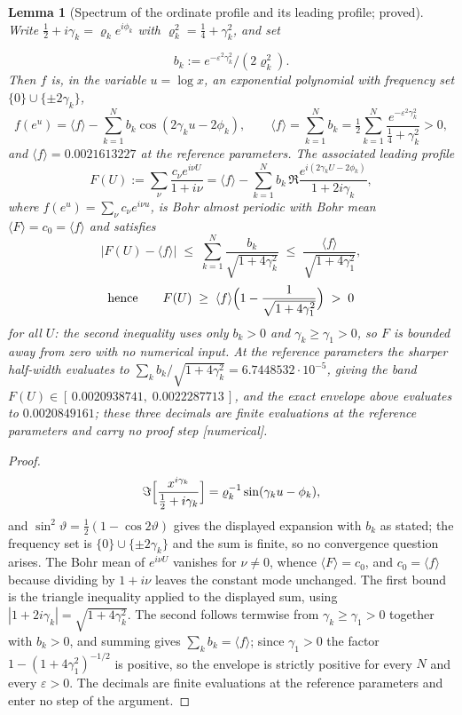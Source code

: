 \documentclass[11pt]{article}
\newtheorem{lemma}[theorem]{Lemma}
\begin{document}
\begin{lemma}[Spectrum of the ordinate profile and its leading profile;
proved]
\label{lem:fmean}
Write $\tfrac12+i\gamma_k=\varrho_ke^{i\phi_k}$ with
$\varrho_k^2=\tfrac14+\gamma_k^2$, and set

\[
b_k:=e^{-\varepsilon^2\gamma_k^2}/(2\varrho_k^2).
\]
 Then $f$ is, in the
variable $u=\log x$, an exponential polynomial with frequency set
$\{0\}\cup\{\pm2\gamma_k\}$,
\[
f(e^u)=\langle f\rangle-\sum_{k=1}^{N}b_k\cos(2\gamma_ku-2\phi_k),
\qquad
\langle f\rangle=\sum_{k=1}^{N}b_k
=\tfrac12\sum_{k=1}^{N}\frac{e^{-\varepsilon^2\gamma_k^2}}
{\tfrac14+\gamma_k^2}>0 ,
\]
and $\langle f\rangle=0.0021613227$ at the reference parameters. The
associated \emph{leading profile}
\[
F(U):=\sum_{\nu}\frac{c_\nu e^{i\nu U}}{1+i\nu}
=\langle f\rangle-\sum_{k=1}^{N}b_k\,
\Re\frac{e^{i(2\gamma_kU-2\phi_k)}}{1+2i\gamma_k},
\]
where $f(e^u)=\sum_\nu c_\nu e^{i\nu u}$, is Bohr almost periodic with Bohr
mean $\langle F\rangle=c_0=\langle f\rangle$ and satisfies
\[
|F(U)-\langle f\rangle|\;\le\;
\sum_{k=1}^{N}\frac{b_k}{\sqrt{1+4\gamma_k^2}}
\;\le\;\frac{\langle f\rangle}{\sqrt{1+4\gamma_1^2}},
\]
\[
\text{hence}\qquad
F(U)\;\ge\;\langle f\rangle
\Bigl(1-\frac{1}{\sqrt{1+4\gamma_1^2}}\Bigr)\;>\;0
\]
for all $U$: the second inequality uses only $b_k>0$ and
$\gamma_k\ge\gamma_1>0$, so $F$ is bounded away from zero with no numerical
input. At the reference parameters the sharper half-width evaluates to
$\sum_{k}b_k/\sqrt{1+4\gamma_k^2}=6.7448532\cdot10^{-5}$, giving the
band $F(U)\in[\,0.0020938741,\;0.0022287713\,]$, and the exact envelope above
evaluates to $0.0020849161$; these three decimals are finite evaluations at the
reference parameters and carry no proof step [numerical].
\end{lemma}

\begin{proof}
\[
\Im\Bigl[\frac{x^{i\gamma_k}}{\tfrac12+i\gamma_k}\Bigr]
=\varrho_k^{-1}\sin(\gamma_ku-\phi_k),
\]
and $\sin^2\vartheta=\tfrac12(1-\cos2\vartheta)$ gives the displayed expansion
with $b_k$ as stated; the frequency set is $\{0\}\cup\{\pm2\gamma_k\}$ and the
sum is finite, so no convergence question arises. The Bohr mean of
$e^{i\nu U}$ vanishes for $\nu\neq0$, whence $\langle F\rangle=c_0$, and
$c_0=\langle f\rangle$ because dividing by $1+i\nu$ leaves the constant mode
unchanged. The first bound is the triangle inequality applied to the displayed sum,
using $|1+2i\gamma_k|=\sqrt{1+4\gamma_k^2}$. The second follows termwise from
$\gamma_k\ge\gamma_1>0$ together with $b_k>0$, and summing gives
$\sum_k b_k=\langle f\rangle$; since $\gamma_1>0$ the factor
$1-(1+4\gamma_1^2)^{-1/2}$ is positive, so the envelope is strictly positive for
every $N$ and every $\varepsilon>0$. The decimals are finite evaluations at the
reference parameters and enter no step of the argument.
\end{proof}
\end{document}
